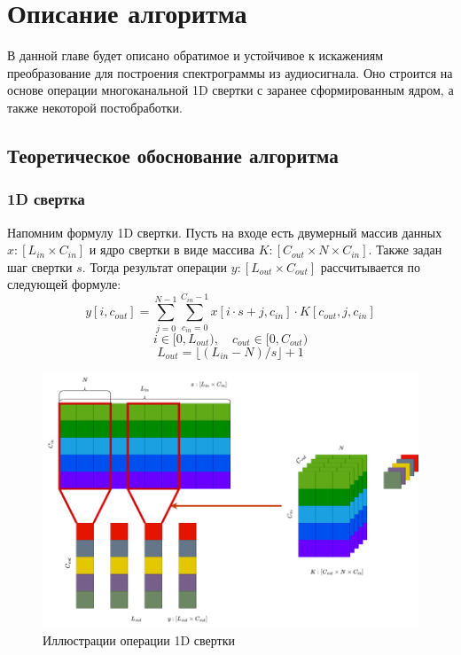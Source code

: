 \chapter{Описание алгоритма}
\label{cha:ch_2}

В данной главе будет описано обратимое и устойчивое к искажениям преобразование для построения спектрограммы из аудиосигнала.
Оно строится на основе операции многоканальной 1D свертки с заранее сформированным ядром, а также некоторой постобработки.

\section{Теоретическое обоснование алгоритма}

\subsection{1D свертка}
Напомним формулу 1D свертки. Пусть на входе есть двумерный массив данных $x: [L_{in} \times  C_{in}]$ 
и ядро свертки в виде массива $K: [C_{out} \times N \times C_{in}]$. Также задан шаг свертки $s$.
Тогда результат операции $y: [L_{out} \times C_{out}]$ рассчитывается по следующей формуле:
\begin{equation}
	y[i, c_{out}] = \sum_{j=0}^{N-1} \sum_{c_{in}=0}^{C_{in}-1} x[i \cdot s + j, c_{in}] \cdot K[c_{out}, j, c_{in}]
\end{equation}
\[i \in [0, L_{out}), \quad c_{out} \in [0, C_{out})\]
\[L_{out} = \lfloor(L_{in} - N) / s\rfloor + 1\]

\begin{figure}
  \centering
  \includegraphics[width=0.9\linewidth]{figures/conv1d_drawio}
  \caption{Иллюстрации операции 1D свертки}
  \label{fig:conv1d_drawio}
\end{figure}

